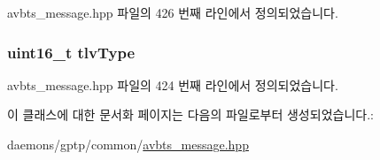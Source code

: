 avbts\+\_\+message.\+hpp 파일의 426 번째 라인에서 정의되었습니다.

\subsubsection[{\texorpdfstring{tlv\+Type}{tlvType}}]{\setlength{\rightskip}{0pt plus 5cm}uint16\+\_\+t tlv\+Type\hspace{0.3cm}{\ttfamily [private]}}\hypertarget{class_path_trace_t_l_v_a90baf0e86e13da82746e3aab1436388b}{}\label{class_path_trace_t_l_v_a90baf0e86e13da82746e3aab1436388b}


avbts\+\_\+message.\+hpp 파일의 424 번째 라인에서 정의되었습니다.



이 클래스에 대한 문서화 페이지는 다음의 파일로부터 생성되었습니다.\+:\begin{DoxyCompactItemize}
\item 
daemons/gptp/common/\hyperlink{avbts__message_8hpp}{avbts\+\_\+message.\+hpp}\end{DoxyCompactItemize}
